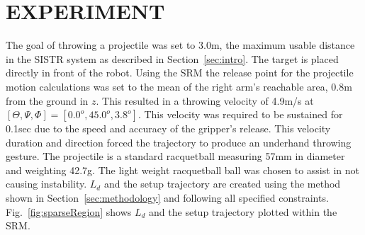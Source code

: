 \section{EXPERIMENT}\label{sec:exp}
The goal of throwing a projectile was set to 3.0m, the maximum usable distance in the SISTR system as described in Section~\ref{sec:intro}.  The target is placed directly in front of the robot.  Using the SRM the release point for the projectile motion calculations was set to the mean of the right arm's reachable area, 0.8m from the ground in $z$.  This resulted in a throwing velocity of 4.9m/s at $[\Theta, \Psi, \Phi] =[0.0^o,45.0^o, 3.8^o]$.  This velocity was required to be sustained for 0.1sec due to the speed and accuracy of the gripper's release.  This velocity duration and direction forced the trajectory to produce an underhand throwing gesture.  The projectile is a standard racquetball measuring 57mm in diameter and weighting 42.7g.  The light weight racquetball ball was chosen to assist in not causing instability.  $L_d$ and the setup trajectory are created using the method shown in Section~\ref{sec:methodology} and following all specified constraints.  Fig.~\ref{fig:sparseRegion} shows $L_d$ and the setup trajectory plotted within the SRM.



